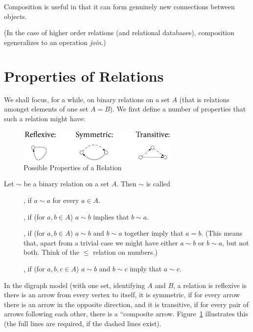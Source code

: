 Composition is useful in that it can form genuinely new connections between
objects. 

(In the case of higher order relations (and relational databases),
composition egeneralizes to an operation {\em join}.)

\section{Properties of Relations}

We shall focus, for a while, on binary relations on a set $A$ (that is
relations amongst elements of one set $A=B$). We first
define a number of
properties that such a relation might have:
\begin{figure}
\begin{center}
\includegraphics[width=8cm]{pic/RepPropsDigraph}
\end{center}
\caption{Possible Properties of a Relation}
\label{figreppropsdigraph}
\end{figure}
\begin{defn}
Let $\sim$ be a binary relation on a set $A$. Then $\sim$ is called
\begin{description}
\item[], if $a\sim a$ for every $a\in A$.
\item[], if (for $a,b\in A$) $a\sim b$ implies that $b\sim a$.
\item[], if (for $a,b\in A$) $a\sim b$ and $b\sim a$ together
imply that $a=b$. (This means that, apart from a trivial case we might have either
$a\sim b$ or $b\sim a$, but not both. Think of the $\le$ relation on numbers.)
\item[], if (for $a,b,c\in A$) $a\sim b$ and $b\sim c$ imply that
$a\sim c$.
\end{description}
\end{defn}
In the digraph model (with one set, identifying $A$ and $B$, a relation is reflexive is
there is an arrow from every vertex to itself, it is symmetric, if for every arrow there
is an arrow in the opposite direction, and it is transitive, if for every pair of arrows
following each other, there is a ``composite arrow. Figure~\ref{figreppropsdigraph}
illustrates this (the full lines are required, if the dashed lines exist).

